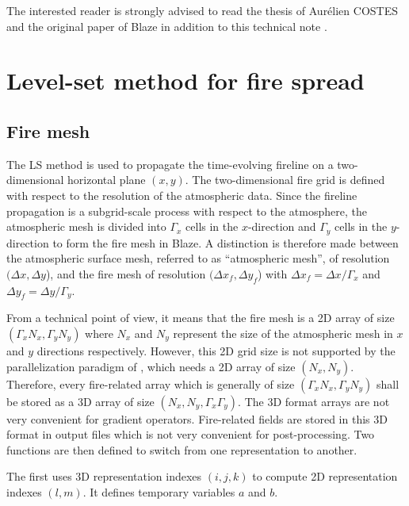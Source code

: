 The interested reader is strongly advised to read the thesis of Aurélien COSTES and the original paper of Blaze in addition to this technical note \citep{costes2021subgrid}.

\section{Level-set method for fire spread}

\subsection{Fire mesh}

The LS method is used to propagate the time-evolving fireline on a two-dimensional horizontal plane $(x, y)$. The two-dimensional fire grid is defined with respect to the resolution of the atmospheric data.
Since the fireline propagation is a subgrid-scale process with respect to the atmosphere, the atmospheric mesh is divided into $\Gamma_x$ cells in the $x$-direction and $\Gamma_y$ cells in the $y$-direction to form the fire mesh in Blaze.
A distinction is therefore made between the atmospheric surface mesh, referred to as ``atmospheric mesh'', of resolution $(\Delta x, \Delta y$), and the fire mesh of resolution $(\Delta x_f, \Delta y_f$) with $\Delta x_f = \Delta x / \Gamma_x$ and $\Delta y_f = \Delta y / \Gamma_y$.

\bigskip

From a technical point of view, it means that the fire mesh is a 2D array of size $(\Gamma_x N_x, \Gamma_y N_y)$ where $N_x$ and $N_y$ represent the size of the atmospheric mesh in $x$ and $y$ directions respectively.
However, this 2D grid size is not supported by the parallelization paradigm of \MNH, which needs a 2D array of size $(N_x, N_y)$.
Therefore, every fire-related array which is generally of size $(\Gamma_x N_x, \Gamma_y N_y)$ shall be stored as a 3D array of size $(N_x, N_y, \Gamma_x \Gamma_y)$.
The 3D format arrays are not very convenient for gradient operators.
Fire-related fields are stored in this 3D format in output files which is not very convenient for post-processing. 
Two functions are then defined to switch from one representation to another.

\medskip

The first uses 3D representation indexes $(i,j,k)$ to compute 2D representation indexes $(l, m)$. It defines temporary variables $a$ and $b$.

